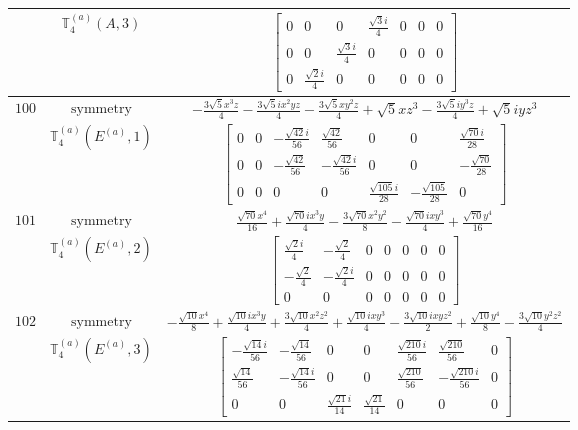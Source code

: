 \documentclass[fleqn,8pt,landscape]{jsarticle}
\begin{document}
\begin{longtable}{ccc}
$  $ & $ \mathbb{T}_{4}^{(a)}(A,3) $ & $ \begin{bmatrix} 0 & 0 & 0 & \frac{\sqrt{3} i}{4} & 0 & 0 & 0 \\ 0 & 0 & \frac{\sqrt{3} i}{4} & 0 & 0 & 0 & 0 \\ 0 & \frac{\sqrt{2} i}{4} & 0 & 0 & 0 & 0 & 0 \end{bmatrix} $ \\ \hline
$ 100 $ & $ \text{symmetry} $ & $ - \frac{3 \sqrt{5} x^{3} z}{4} - \frac{3 \sqrt{5} i x^{2} y z}{4} - \frac{3 \sqrt{5} x y^{2} z}{4} + \sqrt{5} x z^{3} - \frac{3 \sqrt{5} i y^{3} z}{4} + \sqrt{5} i y z^{3} $ \\
$  $ & $ \mathbb{T}_{4}^{(a)}(E^{(a)},1) $ & $ \begin{bmatrix} 0 & 0 & - \frac{\sqrt{42} i}{56} & \frac{\sqrt{42}}{56} & 0 & 0 & \frac{\sqrt{70} i}{28} \\ 0 & 0 & - \frac{\sqrt{42}}{56} & - \frac{\sqrt{42} i}{56} & 0 & 0 & - \frac{\sqrt{70}}{28} \\ 0 & 0 & 0 & 0 & \frac{\sqrt{105} i}{28} & - \frac{\sqrt{105}}{28} & 0 \end{bmatrix} $ \\ \hline
$ 101 $ & $ \text{symmetry} $ & $ \frac{\sqrt{70} x^{4}}{16} + \frac{\sqrt{70} i x^{3} y}{4} - \frac{3 \sqrt{70} x^{2} y^{2}}{8} - \frac{\sqrt{70} i x y^{3}}{4} + \frac{\sqrt{70} y^{4}}{16} $ \\
$  $ & $ \mathbb{T}_{4}^{(a)}(E^{(a)},2) $ & $ \begin{bmatrix} \frac{\sqrt{2} i}{4} & - \frac{\sqrt{2}}{4} & 0 & 0 & 0 & 0 & 0 \\ - \frac{\sqrt{2}}{4} & - \frac{\sqrt{2} i}{4} & 0 & 0 & 0 & 0 & 0 \\ 0 & 0 & 0 & 0 & 0 & 0 & 0 \end{bmatrix} $ \\ \hline
$ 102 $ & $ \text{symmetry} $ & $ - \frac{\sqrt{10} x^{4}}{8} + \frac{\sqrt{10} i x^{3} y}{4} + \frac{3 \sqrt{10} x^{2} z^{2}}{4} + \frac{\sqrt{10} i x y^{3}}{4} - \frac{3 \sqrt{10} i x y z^{2}}{2} + \frac{\sqrt{10} y^{4}}{8} - \frac{3 \sqrt{10} y^{2} z^{2}}{4} $ \\
$  $ & $ \mathbb{T}_{4}^{(a)}(E^{(a)},3) $ & $ \begin{bmatrix} - \frac{\sqrt{14} i}{56} & - \frac{\sqrt{14}}{56} & 0 & 0 & \frac{\sqrt{210} i}{56} & \frac{\sqrt{210}}{56} & 0 \\ \frac{\sqrt{14}}{56} & - \frac{\sqrt{14} i}{56} & 0 & 0 & \frac{\sqrt{210}}{56} & - \frac{\sqrt{210} i}{56} & 0 \\ 0 & 0 & \frac{\sqrt{21} i}{14} & \frac{\sqrt{21}}{14} & 0 & 0 & 0 \end{bmatrix} $ \\ \hline

\end{longtable}
\end{document}
